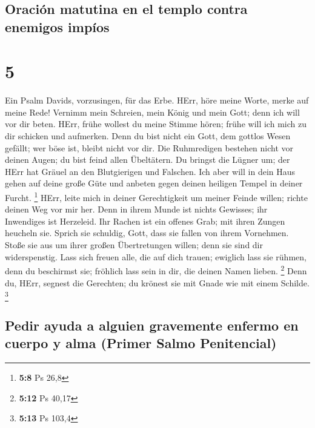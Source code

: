 \hypertarget{oraciuxf3n-matutina-en-el-templo-contra-enemigos-impuxedos}{%
\subsection{Oración matutina en el templo contra enemigos
impíos}\label{oraciuxf3n-matutina-en-el-templo-contra-enemigos-impuxedos}}

\hypertarget{section-4}{%
\section{5}\label{section-4}}

 Ein Psalm Davids, vorzusingen, für das Erbe.
 HErr, höre meine Worte, merke auf meine Rede!
 Vernimm mein Schreien, mein König und mein Gott; denn ich
will vor dir beten.  HErr, frühe wollest du meine Stimme
hören; frühe will ich mich zu dir schicken und aufmerken. 
Denn du bist nicht ein Gott, dem gottlos Wesen gefällt; wer böse ist,
bleibt nicht vor dir.  Die Ruhmredigen bestehen nicht vor
deinen Augen; du bist feind allen Übeltätern.  Du bringst
die Lügner um; der HErr hat Gräuel an den Blutgierigen und Falschen.
 Ich aber will in dein Haus gehen auf deine große Güte und
anbeten gegen deinen heiligen Tempel in deiner Furcht. \footnote{\textbf{5:8}
  Ps 26,8}  HErr, leite mich in deiner Gerechtigkeit um
meiner Feinde willen; richte deinen Weg vor mir her. 
Denn in ihrem Munde ist nichts Gewisses; ihr Inwendiges ist Herzeleid.
Ihr Rachen ist ein offenes Grab; mit ihren Zungen heucheln sie.
 Sprich sie schuldig, Gott, dass sie fallen von ihrem
Vornehmen. Stoße sie aus um ihrer großen Übertretungen willen; denn sie
sind dir widerspenstig.  Lass sich freuen alle, die auf
dich trauen; ewiglich lass sie rühmen, denn du beschirmst sie; fröhlich
lass sein in dir, die deinen Namen lieben. \footnote{\textbf{5:12} Ps
  40,17}  Denn du, HErr, segnest die Gerechten; du
krönest sie mit Gnade wie mit einem Schilde. \footnote{\textbf{5:13} Ps
  103,4}

\hypertarget{pedir-ayuda-a-alguien-gravemente-enfermo-en-cuerpo-y-alma-primer-salmo-penitencial}{%
\subsection{Pedir ayuda a alguien gravemente enfermo en cuerpo y alma
(Primer Salmo
Penitencial)}\label{pedir-ayuda-a-alguien-gravemente-enfermo-en-cuerpo-y-alma-primer-salmo-penitencial}}

